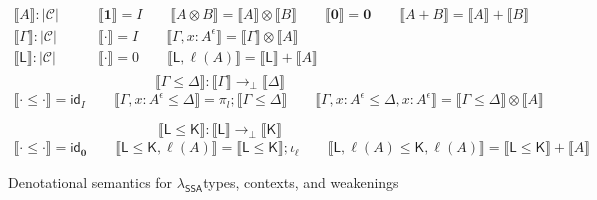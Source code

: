 \documentclass[acmsmall,screen,review]{acmart}
\newcommand{\mc}[1]{\ensuremath{\mathcal{#1}}}
\newcommand{\mb}[1]{\ensuremath{\mathbf{#1}}}
\newcommand{\ms}[1]{\ensuremath{\mathsf{#1}}}
\newcommand{\thyp}[3]{#1 : {#2}^{#3}}
\newcommand{\lhyp}[2]{#1(#2)}
\newcommand{\dnt}[1]{\llbracket{#1}\rrbracket}
\newcommand{\isotopessa}{\(\lambda_{\ms{SSA}}\)}
\begin{document}
\begin{figure}[H]
  \begin{align*}
    \boxed{\dnt{A} : |\mc{C}|} \qquad 
    & \dnt{\mb{1}} = I \qquad
      \dnt{A \otimes B} = \dnt{A} \otimes \dnt{B} \qquad
      \dnt{\mb{0}} = \mb{0} \qquad
      \dnt{A + B} = \dnt{A} + \dnt{B} \qquad \\
    \boxed{\dnt{\Gamma} : |\mc{C}|} \qquad
    & \dnt{\cdot} = I \qquad
      \dnt{\Gamma, \thyp{x}{A}{\epsilon}} = \dnt{\Gamma} \otimes \dnt{A} \\
    \boxed{\dnt{\ms{L}} : |\mc{C}|} \qquad
    & \dnt{\cdot} = 0 \qquad
      \dnt{\ms{L}, \lhyp{\ell}{A}} = \dnt{\ms{L}} + \dnt{A} \\
  \end{align*}
  \begin{equation*}
    \boxed{\dnt{\Gamma \leq \Delta} : \dnt{\Gamma} \to_\bot \dnt{\Delta}}
  \end{equation*}
  \begin{gather*}
    \dnt{\cdot \leq \cdot} = \ms{id}_I \qquad
    \dnt{\Gamma, \thyp{x}{A}{\epsilon} \leq \Delta} = \pi_l;\dnt{\Gamma \leq \Delta} \qquad
    \dnt{\Gamma, \thyp{x}{A}{\epsilon} \leq \Delta, \thyp{x}{A}{\epsilon}}
    = \dnt{\Gamma \leq \Delta} \otimes \dnt{A} \\ \\
  \end{gather*}
  \begin{equation*}
    \boxed{\dnt{\ms{L} \leq \ms{K}} : \dnt{\ms{L}} \to_\bot \dnt{\ms{K}}}
  \end{equation*}
  \begin{gather*}
    \dnt{\cdot \leq \cdot} = \ms{id}_{\mb{0}} \qquad
    \dnt{\ms{L} \leq \ms{K}, \lhyp{\ell}{A}} = \dnt{\ms{L} \leq \ms{K}};\iota_\ell \qquad
    \dnt{\ms{L}, \lhyp{\ell}{A} \leq \ms{K}, \lhyp{\ell}{A}}
    = \dnt{\ms{L} \leq \ms{K}} + \dnt{A}
  \end{gather*}
  \caption{Denotational semantics for \isotopessa types, contexts, and weakenings}
  \Description{}
  \label{fig:ssa-ty-sem}
\end{figure}
\end{document}
